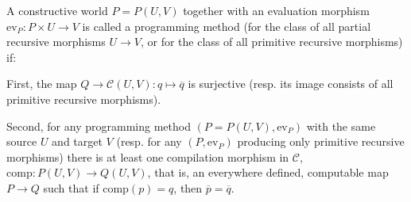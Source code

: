 A constructive world $P = P(U,V)$ together with an evaluation morphism $\text{ev}_P : P \times U \rightarrow V$ is called a programming method (for the class of all partial recursive morphisms $U \rightarrow V$, or for the class of all primitive recursive morphisms) if:

First, the map $Q \rightarrow \mathcal{C}(U,V) : q \mapsto \overline{q}$ is surjective (resp. its image consists of all primitive recursive morphisms).

Second, for any programming method $(P = P(U,V), \text{ev}_P)$ with the same source $U$ and target $V$ (resp. for any $(P,\text{ev}_P)$ producing only primitive recursive morphisms) there is at least one compilation morphism in $\mathcal{C}$, $\text{comp} : P(U,V) \rightarrow Q(U,V)$, that is, an everywhere defined, computable map $P \rightarrow Q$ such that if $\text{comp}(p) = q$, then $\overline{p} = \overline{q}$.

